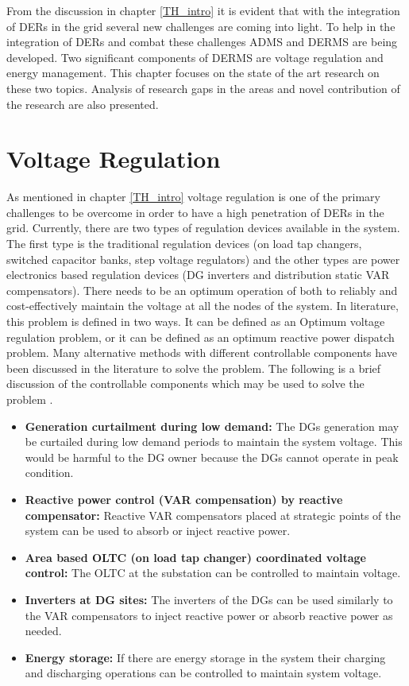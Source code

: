 From the discussion in chapter \ref{TH_intro} it is evident that with the integration of DERs in the grid several new challenges are coming into light. To help in the integration of DERs and combat these challenges ADMS and DERMS are being developed. Two significant components of DERMS are voltage regulation and energy management. This chapter focuses on the state of the art research on these two topics. Analysis of research gaps in the areas and novel contribution of the research are also presented. 
\section{Voltage Regulation}
As mentioned in chapter \ref{TH_intro} voltage regulation is one of the primary challenges to be overcome in order to have a high penetration of DERs in the grid. Currently, there are two types of regulation devices available in the system. The first type is the traditional regulation devices (on load tap changers, switched capacitor banks, step voltage regulators) and the other types are power electronics based regulation devices (DG inverters and distribution static VAR compensators). There needs to be an optimum operation of both to reliably and cost-effectively maintain the voltage at all the nodes of the system. In literature, this problem is defined in two ways. It can be defined as an Optimum voltage regulation problem, or it can be defined as an optimum reactive power dispatch problem. Many alternative methods with different controllable components have been discussed in the literature to solve the problem. The following is a brief discussion of the controllable components which may be used to solve the problem \cite{VC_1}. 
\begin{itemize}
    \item \textbf{Generation curtailment during low demand:} The DGs generation may be curtailed during low demand periods to maintain the system voltage. This would be harmful to the DG owner because the DGs cannot operate in peak condition.
    \item \textbf{Reactive power control (VAR compensation) by reactive compensator:} Reactive VAR compensators placed at strategic points of the system can be used to absorb or inject reactive power.  
    \item \textbf{Area based OLTC (on load tap changer) coordinated voltage control:} The OLTC at the substation can be controlled to maintain voltage.
    \item \textbf{Inverters at DG sites:} The inverters of the DGs can be used similarly to the VAR compensators to inject reactive power or absorb reactive power as needed.
    \item \textbf{Energy storage:} If there are energy storage in the system their charging and discharging operations can be controlled to maintain system voltage.
\end{itemize}

